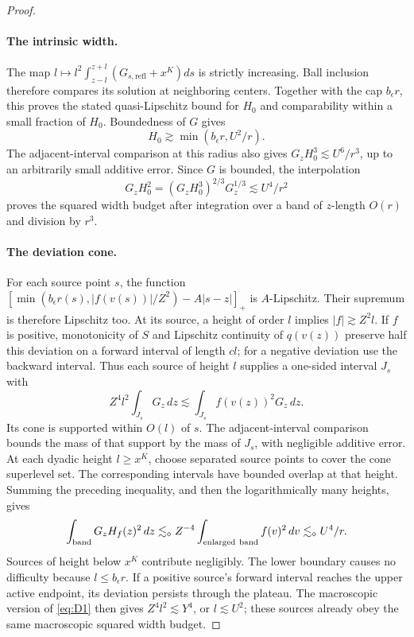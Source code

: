 \begin{proof}
\leavevmode\par
\paragraph{The intrinsic width.}
The map
$l\mapsto l^2\int_{z-l}^{z+l}(G_{s,\mathrm{refl}}+x^K)ds$
is strictly increasing.  Ball inclusion therefore compares its solution
at neighboring centers.  Together with the cap $b_\epsilon r$, this
proves the stated quasi-Lipschitz bound for $H_0$ and comparability
within a small fraction of $H_0$.  Boundedness of $G$ gives
\[
 H_0\gtrsim\min(b_\epsilon r,U^2/r).
\]
The adjacent-interval comparison at this radius also gives
$G_zH_0^3\lesssim U^6/r^3$, up to an arbitrarily small additive error.
Since $G$ is bounded, the interpolation
\[
 G_zH_0^2=(G_zH_0^3)^{2/3}G_z^{1/3}\lesssim U^4/r^2
\]
proves the squared width budget after integration over a band of
$z$-length $O(r)$ and division by $r^3$.

\paragraph{The deviation cone.}
For each source point $s$, the function
$[\min(b_\epsilon r(s),|f(v(s))|/Z^2)-A|s-z|]_+$
is $A$-Lipschitz.  Their supremum is therefore Lipschitz too.  At its
source, a height of order $l$ implies $|f|\gtrsim Z^2l$.
If $f$ is positive, monotonicity of $S$ and Lipschitz continuity of
$q(v(z))$ preserve half this deviation on a forward interval of
length $cl$; for a negative deviation use the backward interval.
Thus each source of height $l$ supplies a one-sided interval $J_s$ with
\[
 Z^4l^2\int_{J_s}G_z\,dz
       \lesssim \int_{J_s}f(v(z))^2G_z\,dz.
\]
Its cone is supported within $O(l)$ of $s$.  The adjacent-interval
comparison bounds the mass of that support by the mass of $J_s$, with
negligible additive error.  At each dyadic height $l\ge x^K$, choose
separated source points to cover the cone superlevel set.  The
corresponding intervals have bounded overlap at that height.  Summing
the preceding inequality, and then the logarithmically many heights,
gives
\[
 \int_{\rm band}G_zH_f(z)^2\,dz
 \lesssim_\diamond Z^{-4}\int_{\rm enlarged\ band}f(v)^2\,dv
 \lesssim_\diamond U^4/r.
\]
Sources of height below $x^K$ contribute negligibly.  The lower boundary
causes no difficulty because $l\le b_\epsilon r$.  If a positive
source's forward interval reaches the upper active endpoint, its
deviation persists through the plateau.  The macroscopic version of
\eqref{eq:D1} then gives $Z^4l^2\lesssim Y^4$, or $l\lesssim U^2$;
these sources already obey the same macroscopic squared width budget.


\end{proof}
